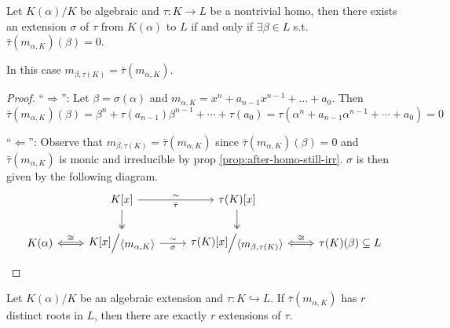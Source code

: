 \begin{lemma} \label{lemma:extension-exists-condition}
  Let $K(\alpha) / K$ be algebraic and $\tau: K \to L$ be a nontrivial homo,
  then there exists an extension $\sigma$ of $\tau$ from $K(\alpha)$ to $L$ if
  and only if $\exists \beta \in L$ s.t. $\bar\tau(m_{\alpha, K})(\beta) = 0$.

  In this case $m_{\beta, \tau(K)} = \bar\tau(m_{\alpha, K})$.

\begin{proof}
  ``$\Rightarrow$'': Let $\beta = \sigma(\alpha)$ and $m_{\alpha, K} = x^n + a_{n-1} x^{n-1} + \ldots + a_0$.
  Then $\bar\tau(m_{\alpha, K})(\beta) = \beta^n + \tau(a_{n-1})\beta^{n-1} + \cdots + \tau(a_0)
  = \tau(\alpha^n + a_{n-1} \alpha^{n-1} + \cdots + a_0) = 0$

  ``$\Leftarrow$'': Observe that $m_{\beta, \tau(K)} = \bar\tau(m_{\alpha, K})$ since
  $\bar\tau(m_{\alpha, K})(\beta) = 0$ and $\bar\tau(m_{\alpha, K})$ is monic and irreducible
  by prop \ref{prop:after-homo-still-irr}. $\sigma$ is then given by the following diagram.
  \[
    \begin{tikzcd}
      & K[x] \arrow[r, "\sim", "\bar\tau"'] \arrow[d, two heads]
      & \tau(K)[x] \arrow[d, two heads] \\
      K(\alpha) \arrow[r, Leftrightarrow, "\cong"]
      & \raisebox{.1em}{$K[x]$} \Big/ \raisebox{-.1em}{$\langle m_{\alpha, K} \rangle$}
      \arrow[r, "\sim", "\sigma"']
      & \raisebox{.1em}{$\tau(K)[x]$} \Big/ \raisebox{-.1em}{$\langle m_{\beta, \tau(K)} \rangle$}
      \arrow[r, Leftrightarrow, "\cong"]
      & \tau(K)(\beta) \subseteq L
    \end{tikzcd}
  \]
\end{proof}
\end{lemma}

\begin{coro} \label{coro:num-of-extensions}
  Let $K(\alpha)/K$ be an algebraic extension and $\tau: K \hookrightarrow L$.
  If $\bar\tau(m_{\alpha, K})$ has $r$ distinct roots in $L$, then there are exactly $r$ extensions of $\tau$.
\end{coro}

